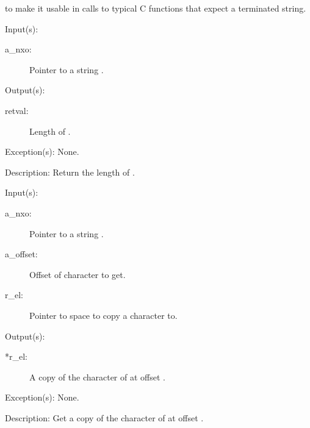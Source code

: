 \begin{capi}
\begin{capilist}
		to make it usable in calls to typical C functions that expect a
		terminated string.
	\end{capilist}
\label{nxo_string_len_get}
	\begin{capilist}
	\item[Input(s): ]
		\begin{description}\item[]
		\item[a\_nxo: ]
			Pointer to a string .
		\end{description}
	\item[Output(s): ]
		\begin{description}\item[]
		\item[retval: ]
			Length of .
		\end{description}
	\item[Exception(s): ] None.
	\item[Description: ]
		Return the length of .
	\end{capilist}
\label{nxo_string_el_get}
	\begin{capilist}
	\item[Input(s): ]
		\begin{description}\item[]
		\item[a\_nxo: ]
			Pointer to a string \classname{nxo}.
		\item[a\_offset: ]
			Offset of character to get.
		\item[r\_el: ]
			Pointer to space to copy a character to.
		\end{description}
	\item[Output(s): ]
		\begin{description}\item[]
		\item[*r\_el: ]
			A copy of the character of  at offset
			\cvar{a\_offset}.
		\end{description}
	\item[Exception(s): ] None.
	\item[Description: ]
		Get a copy of the character of  at offset
		\cvar{a\_offset}.
	\end{capilist}

\end{capi}

